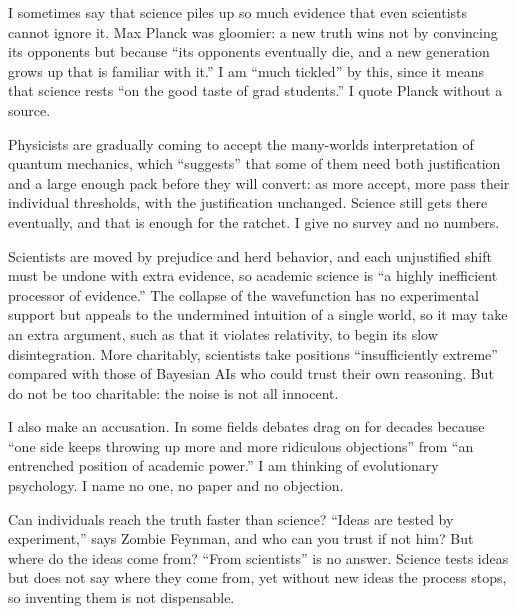 
I sometimes say that science piles up so much evidence that even scientists cannot ignore it. Max Planck was gloomier: a new truth wins not by convincing its opponents but because ``its opponents eventually die, and a new generation grows up that is familiar with it.'' I am ``much tickled'' by this, since it means that science rests ``on the good taste of grad students.'' I quote Planck without a source. 

Physicists are gradually coming to accept the many-worlds interpretation of quantum mechanics, which ``suggests'' that some of them need both justification and a large enough pack before they will convert: as more accept, more pass their individual thresholds, with the justification unchanged. Science still gets there eventually, and that is enough for the ratchet. I give no survey and no numbers. 

Scientists are moved by prejudice and herd behavior, and each unjustified shift must be undone with extra evidence, so academic science is ``a highly inefficient processor of evidence.''  The collapse of the wavefunction has no experimental support but appeals to the undermined intuition of a single world, so it may take an extra argument, such as that it violates relativity, to begin its slow disintegration.  More charitably, scientists take positions ``insufficiently extreme'' compared with those of Bayesian AIs who could trust their own reasoning. But do not be too charitable: the noise is not all innocent.

I also make an accusation. In some fields debates drag on for decades because ``one side keeps throwing up more and more ridiculous objections'' from ``an entrenched position of academic power.'' I am thinking of evolutionary psychology. I name no one, no paper and no objection.

Can individuals reach the truth faster than science? ``Ideas are tested by experiment,'' says Zombie Feynman, and who can you trust if not him? But where do the ideas come from? ``From scientists'' is no answer. Science tests ideas but does not say where they come from, yet without new ideas the process stops, so inventing them is not dispensable. 

